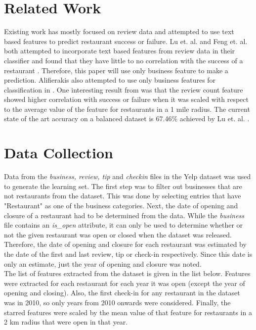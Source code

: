 \documentclass[12pt]{article}
\begin{document}
  \section{Related Work}

  Existing work has mostly focused on review data and attempted to use text based features to predict restaurant success or failure. Lu et. al. and Feng et. al. both attempted to incorporate text based features from review data in their classifier and found that they have little to no correlation with the success of a restaurant \cite{Feng16, Lu18}. Therefore, this paper will use only business feature to make a prediction. Alifierakis also attempted to use only business features for classification in \cite{Alifierakis18}. One interesting result from \cite{Alifierakis18} was that the review count feature showed higher correlation with success or failure when it was scaled with respect to the average value of the feature for restaurants in a 1 mile radius. The current state of the art accuracy on a balanced dataset is 67.46\% achieved by Lu et. al. \cite{Lu18}.

  \section{Data Collection}

  Data from the \emph{business, review, tip} and \emph{checkin} files in the Yelp dataset was used to generate the learning set. The first step was to filter out businesses that are not restaurants from the dataset. This was done by selecting entries that have "Restaurant" as one of the business categories. Next, the date of opening and closure of a restaurant had to be determined from the data. While the \emph{business} file contains an \emph{is\_open} attribute, it can only be used to determine whether or not the given restaurant was open or closed when the dataset was released. Therefore, the date of opening and closure for each restaurant was estimated by the date of the first and last review, tip or check-in respectively. Since this date is only an estimate, just the year of opening and closure was noted.\\

  The list of features extracted from the dataset is given in the list below. Features were extracted for each restaurant for each year it was open (except the year of opening and closing). Also, the first check-in for any restaurant in the dataset was in 2010, so only years from 2010 onwards were considered. Finally, the starred features were scaled by the mean value of that feature for restaurants in a 2 km radius that were open in that year.
\end{document}
